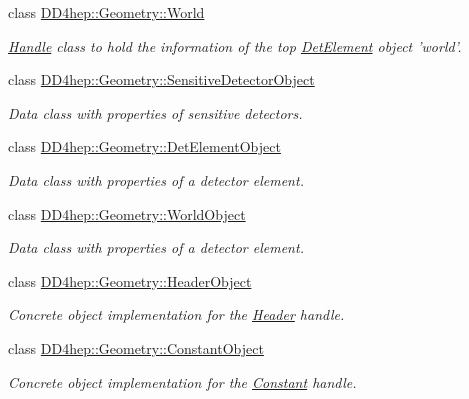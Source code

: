 \begin{DoxyCompactItemize}
class \hyperlink{class_d_d4hep_1_1_geometry_1_1_world}{DD4hep::Geometry::World}
\begin{DoxyCompactList}\small\item\em \hyperlink{class_d_d4hep_1_1_handle}{Handle} class to hold the information of the top \hyperlink{class_d_d4hep_1_1_geometry_1_1_det_element}{DetElement} object 'world'. \item\end{DoxyCompactList}\item 
class \hyperlink{class_d_d4hep_1_1_geometry_1_1_sensitive_detector_object}{DD4hep::Geometry::SensitiveDetectorObject}
\begin{DoxyCompactList}\small\item\em Data class with properties of sensitive detectors. \item\end{DoxyCompactList}\item 
class \hyperlink{class_d_d4hep_1_1_geometry_1_1_det_element_object}{DD4hep::Geometry::DetElementObject}
\begin{DoxyCompactList}\small\item\em Data class with properties of a detector element. \item\end{DoxyCompactList}\item 
class \hyperlink{class_d_d4hep_1_1_geometry_1_1_world_object}{DD4hep::Geometry::WorldObject}
\begin{DoxyCompactList}\small\item\em Data class with properties of a detector element. \item\end{DoxyCompactList}\item 
class \hyperlink{class_d_d4hep_1_1_geometry_1_1_header_object}{DD4hep::Geometry::HeaderObject}
\begin{DoxyCompactList}\small\item\em Concrete object implementation for the \hyperlink{class_d_d4hep_1_1_geometry_1_1_header}{Header} handle. \item\end{DoxyCompactList}\item 
class \hyperlink{class_d_d4hep_1_1_geometry_1_1_constant_object}{DD4hep::Geometry::ConstantObject}
\begin{DoxyCompactList}\small\item\em Concrete object implementation for the \hyperlink{class_d_d4hep_1_1_geometry_1_1_constant}{Constant} handle. \item\end{DoxyCompactList}\item 

\end{DoxyCompactItemize}
